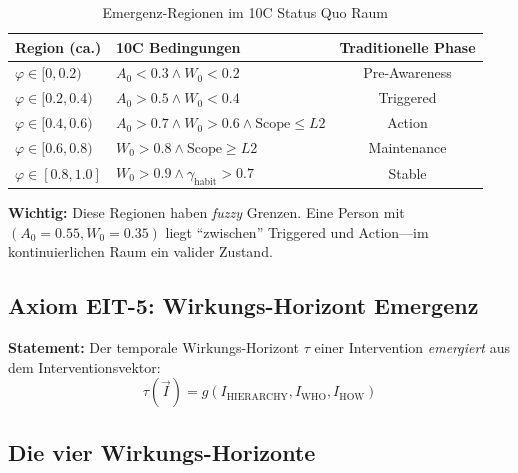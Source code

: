 \begin{table}[htbp]
\centering
\caption{Emergenz-Regionen im 10C Status Quo Raum}
\label{tab:18-emergence-regions}
\renewcommand{\arraystretch}{1.4}
\small
\begin{tabular}{@{}lp{6cm}c@{}}
\toprule
\textbf{Region (ca.)} & \textbf{10C Bedingungen} & \textbf{Traditionelle Phase} \\
\midrule
$\varphi \in [0, 0.2)$ & $A_0 < 0.3 \land W_0 < 0.2$ & Pre-Awareness \\
$\varphi \in [0.2, 0.4)$ & $A_0 > 0.5 \land W_0 < 0.4$ & Triggered \\
$\varphi \in [0.4, 0.6)$ & $A_0 > 0.7 \land W_0 > 0.6 \land \text{Scope} \leq L2$ & Action \\
$\varphi \in [0.6, 0.8)$ & $W_0 > 0.8 \land \text{Scope} \geq L2$ & Maintenance \\
$\varphi \in [0.8, 1.0]$ & $W_0 > 0.9 \land \gamma_{\text{habit}} > 0.7$ & Stable \\
\bottomrule
\end{tabular}
\end{table}

\textbf{Wichtig:} Diese Regionen haben \textit{fuzzy} Grenzen. Eine Person mit $(A_0 = 0.55, W_0 = 0.35)$ liegt ``zwischen'' Triggered und Action---im kontinuierlichen Raum ein valider Zustand.

\subsection{Axiom EIT-5: Wirkungs-Horizont Emergenz}

\begin{tcolorbox}[colback=blue!5!white, colframe=blue!75!black,
    title=\textbf{Axiom EIT-5: Wirkungs-Horizont als emergente Eigenschaft (aus Appendix HHH)}]

\textbf{Statement:} Der temporale Wirkungs-Horizont $\tau$ einer Intervention \textit{emergiert} aus dem Interventionsvektor:
\begin{equation}
\boxed{\tau(\vec{I}) = g(I_{\text{HIERARCHY}}, I_{\text{WHO}}, I_{\text{HOW}})}
\label{eq:18-horizon-emergence}
\end{equation}

\end{tcolorbox}

\subsection{Die vier Wirkungs-Horizonte}

